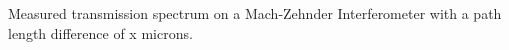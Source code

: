 Measured transmission spectrum on a Mach-Zehnder Interferometer with a path length difference of x microns.